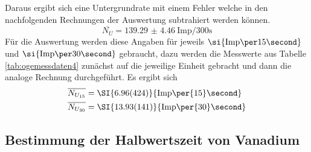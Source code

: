 Daraus ergibt sich eine Untergrundrate mit einem Fehler welche in den nachfolgenden Rechnungen der Auswertung subtrahiert werden können.
\begin{equation}
\overline{N_{U}} = \SI{139.29(446)}{{\text{Imp}}\per{300}\second}
\end{equation}
Für die Auswertung werden diese Angaben für jeweils $\si{{\text{Imp\per}{15}}\second}$ und $\si{{\text{Imp\per}{30}}\second}$ gebraucht, dazu werden die Messwerte aus Tabelle \ref{tab:ogemessdaten4} zunächst 
auf die jeweilige Einheit gebracht und dann die analoge Rechnung durchgeführt. Es ergibt sich
\begin{align}
\overline{N_{U_{15}}} &= \SI{6.96(424)}{{\text{Imp}\per{15}\second}} \\                %
\overline{N_{U_{30}}} &= \SI{13.93(141)}{{\text{Imp}\per{30}\second}}
\end{align}

\subsection{Bestimmung der Halbwertszeit von Vanadium}

